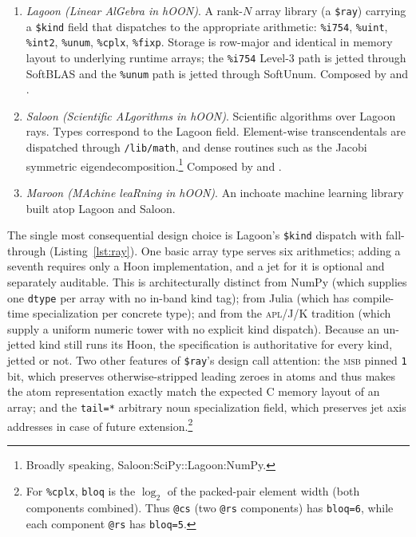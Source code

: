 \documentclass[twoside]{article}
\begin{document}
\begin{enumerate}
\begin{enumerate}
    \item \texttt{/lib/complex}.  Complex arithmetic over the four \textsc{ieee} 754 precisions, riding on the scalar float layer.  Originally composed by .
  \end{enumerate}
  \item \emph{Lagoon (Linear AlGebra in hOON)}.  A rank-$N$ array library (a \texttt{\$ray}) carrying a \texttt{\$kind} field that dispatches to the appropriate arithmetic:  \texttt{\%i754}, \texttt{\%uint}, \texttt{\%int2}, \texttt{\%unum}, \texttt{\%cplx}, \texttt{\%fixp}.  Storage is row-major and identical in memory layout to underlying runtime arrays; the \texttt{\%i754} Level-3 path is jetted through SoftBLAS and the \texttt{\%unum} path is jetted through SoftUnum.  Composed by  and .
  \item  \sloppy\emph{Saloon (Scientific ALgorithms in hOON)}.  Scientific algorithms over Lagoon rays.  Types correspond to the Lagoon field.  Element-wise transcendentals are dispatched through \texttt{/lib/math}, and dense routines such as the Jacobi symmetric eigendecomposition.\footnote{Broadly speaking, Saloon:SciPy::Lagoon:NumPy.}  Composed by  and .
  \item  \emph{Maroon (MAchine leaRning in hOON)}.  An inchoate machine learning library built atop Lagoon and Saloon.
\end{enumerate}

\noindent
The single most consequential design choice is Lagoon's \texttt{\$kind} dispatch with fall-through (Listing~\ref{lst:ray}).  One basic array type serves six arithmetics; adding a seventh requires only a Hoon implementation, and a jet for it is optional and separately auditable.  This is architecturally distinct from NumPy (which supplies one \texttt{dtype} per array with no in-band kind tag); from Julia (which has compile-time specialization per concrete type); and from the \textsc{apl}/J/K tradition (which supply a uniform numeric tower with no explicit kind dispatch).  Because an un-jetted kind still runs its Hoon, the specification is authoritative for every kind, jetted or not.  Two other features of \texttt{\$ray}'s design call attention:  the \textsc{msb} pinned \texttt{1} bit, which preserves otherwise-stripped leading zeroes in atoms and thus makes the atom representation exactly match the expected C memory layout of an array; and the \texttt{tail=*} arbitrary noun specialization field, which preserves jet axis addresses in case of future extension.\footnote{For \texttt{\%cplx}, \texttt{bloq} is the $\log_\text{2}$ of the packed-pair element width (both components combined).  Thus \texttt{@cs} (two \texttt{@rs} components) has \texttt{bloq=6}, while each component \texttt{@rs} has \texttt{bloq=5}.}
\end{document}
